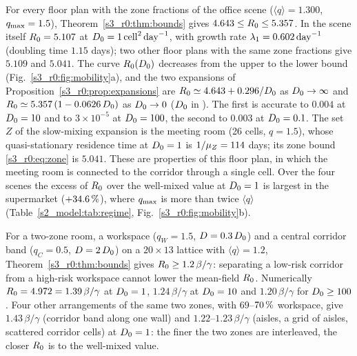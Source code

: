 For every floor plan with the zone fractions of the office scene ($\langle q\rangle=1.300$, $q_{\max}=1.5$),
Theorem~\ref{s3_r0:thm:bounds} gives $4.643\le R_0\le5.357$. In the scene itself $R_0=5.107$ at
$D_0=1\,\mathrm{cell}^2\,\mathrm{day}^{-1}$, with growth rate $\lambda_1=0.602\,\mathrm{day}^{-1}$ (doubling time $1.15$ days); two other floor plans
with the same zone fractions give $5.109$ and $5.041$.
The curve $R_0(D_0)$ decreases from the upper to the lower bound (Fig.~\ref{s3_r0:fig:mobility}a), and the
two expansions of Proposition~\ref{s3_r0:prop:expansions} are $R_0\simeq4.643+0.296/D_0$ as $D_0\to\infty$
and $R_0\simeq5.357\,(1-0.0626\,D_0)$ as $D_0\to0$ ($D_0$ in \cdunit). The first is accurate to $0.004$ at
$D_0=10$ and to $3\times10^{-5}$ at $D_0=100$, the second to $0.003$ at $D_0=0.1$.
The set $Z$ of the slow-mixing expansion is the meeting room (26 cells, $q=1.5$), whose quasi-stationary
residence time at $D_0=1$ is $1/\mu_Z=114$ days; its zone bound \eqref{s3_r0:eq:zone} is $5.041$. These are
properties of this floor plan, in which the meeting room is connected to the corridor through a single cell.
Over the four scenes the excess of $R_0$ over the well-mixed value at $D_0=1$ is largest in the supermarket
($+34.6\,\%$), where $q_{\max}$ is more than twice $\langle q\rangle$ (Table~\ref{s2_model:tab:regime},
Fig.~\ref{s3_r0:fig:mobility}b).

For a two-zone room, a workspace ($q_W=1.5$, $D=0.3\,D_0$) and a central corridor band ($q_C=0.5$,
$D=2\,D_0$) on a $20\times13$ lattice with $\langle q\rangle=1.2$, Theorem~\ref{s3_r0:thm:bounds} gives
$R_0\ge1.2\,\beta/\gamma$: separating a low-risk corridor from a high-risk workspace cannot lower the
mean-field $R_0$. Numerically $R_0=4.972=1.39\,\beta/\gamma$ at $D_0=1$, $1.24\,\beta/\gamma$ at $D_0=10$ and
$1.20\,\beta/\gamma$ for $D_0\ge100$. Four other arrangements of the same two zones, with $69$--$70\,\%$
workspace, give $1.43\,\beta/\gamma$ (corridor band along one wall) and $1.22$--$1.23\,\beta/\gamma$ (aisles, a
grid of aisles, scattered corridor cells) at $D_0=1$: the finer the two zones are interleaved, the closer $R_0$
is to the well-mixed value.

